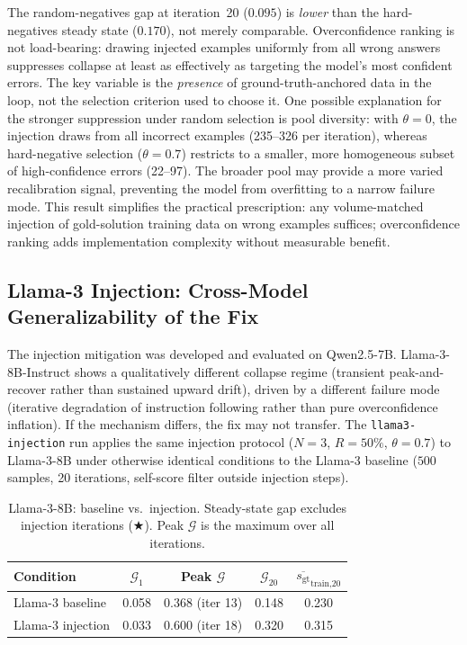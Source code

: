 \documentclass{article}
\newcommand{\gap}{\mathcal{G}}          %
\newcommand{\gt}{s_{\text{gt}}}         %
\begin{document}
The random-negatives gap at iteration~20 ($0.095$) is \emph{lower} than the
hard-negatives steady state ($0.170$), not merely comparable.
Overconfidence ranking is not load-bearing: drawing injected examples uniformly
from all wrong answers suppresses collapse at least as effectively as targeting
the model's most confident errors.
The key variable is the \emph{presence} of ground-truth-anchored data in the
loop, not the selection criterion used to choose it.
One possible explanation for the stronger suppression under random selection is
pool diversity: with $\theta = 0$, the injection draws from all incorrect
examples (235--326 per iteration), whereas hard-negative selection
($\theta = 0.7$) restricts to a smaller, more homogeneous subset of
high-confidence errors (22--97).
The broader pool may provide a more varied recalibration signal, preventing the
model from overfitting to a narrow failure mode.
This result simplifies the practical prescription: any volume-matched injection
of gold-solution training data on wrong examples suffices; overconfidence ranking
adds implementation complexity without measurable benefit.

\subsection{Llama-3 Injection: Cross-Model Generalizability of the Fix}
\label{sec:llama3-injection}

The injection mitigation was developed and evaluated on Qwen2.5-7B.
Llama-3-8B-Instruct shows a qualitatively different collapse regime (transient peak-and-recover
rather than sustained upward drift), driven by a different failure mode (iterative degradation of
instruction following rather than pure overconfidence inflation).
If the mechanism differs, the fix may not transfer.
The \texttt{llama3-injection} run applies the same injection protocol
($N{=}3$, $R{=}50\%$, $\theta{=}0.7$) to Llama-3-8B under otherwise identical conditions
to the Llama-3 baseline ($500$ samples, 20 iterations, self-score filter outside injection steps).

\begin{table}[h]
\centering
\caption{Llama-3-8B: baseline vs.\ injection. Steady-state gap excludes injection
iterations ($\bigstar$). Peak $\gap$ is the maximum over all iterations.}
\label{tab:llama3-injection}
\small
\begin{tabular}{lcccc}
\toprule
Condition & $\gap_1$ & Peak $\gap$ & $\gap_{20}$ & $\overline{\gt}_\text{train,20}$ \\
\midrule
Llama-3 baseline  & 0.058 & 0.368 (iter 13) & 0.148 & 0.230 \\
Llama-3 injection & 0.033 & 0.600 (iter 18) & 0.320 & 0.315 \\
\bottomrule
\end{tabular}
\end{table}
\end{document}
